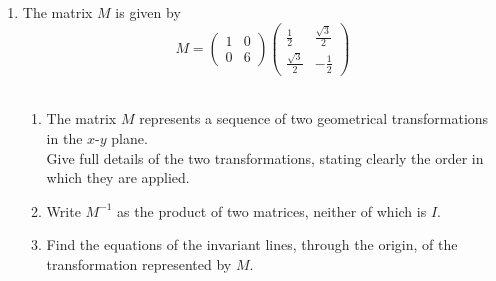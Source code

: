 \documentclass[leqno]{article}
\newcommand{\questionitem}{%
  \item\phantomsection
  \addcontentsline{toc}{section}{Question \number\value{enumi}}%
}
\begin{document}
\begin{enumerate}[
  label=\textbf{\arabic*.},
  leftmargin=*,
  topsep=0pt,
  partopsep=0pt,
  parsep=0pt
]
\begin{tcolorbox}[colback=white, colframe=scarlet, title={\textbf{Solution}}, breakable, grow to left by=6mm, grow to right by=10mm]
\begin{enumerate}[label=\textbf{(\alph*)}]
  So the image is $P'=(-8,1)$.

  For a reflection, the mirror line is the perpendicular bisector of $PP'$. So the closest point on the mirror line to $P$ is the midpoint of $PP'$:
  \[
  \left(\frac{4+(-8)}{2},\frac{7+1}{2}\right)
  =
  \left(\frac{-4}{2},\frac{8}{2}\right)
  =
  (-2,4)
  \]

  Therefore the point on the mirror line closest to $P$ is $(-2,4)$.

  \item The mirror line is $y=-2x$, which passes through the origin.

  The line $2x+by=6$ does not pass through the origin, so it cannot be the mirror line. For it to be invariant under the reflection, it must be perpendicular to the mirror line.

  The slope of $y=-2x$ is $-2$.

  Rewrite $2x+by=6$ as
  \[
  y=-\frac{2}{b}x+\frac{6}{b}
  \]
  so its slope is $-\dfrac{2}{b}$.

  Since perpendicular lines have slopes whose product is $-1$,
  \[
  (-2)\left(-\frac{2}{b}\right)=-1
  \]

  So
  \[
  \frac{4}{b}=-1
  \]
  giving
  \[
  b=-4
  \]

  Therefore $b=-4$.
\end{enumerate}
\end{tcolorbox}


\newpage

\questionitem

The matrix $M$ is given by
\[
M = \begin{pmatrix} 1 & 0 \\[6pt] 0 & 6 \end{pmatrix}\begin{pmatrix} \frac{1}{2} & \frac{\sqrt{3}}{2} \\[6pt] \frac{\sqrt{3}}{2} & -\frac{1}{2} \end{pmatrix}
\] \\
\begin{enumerate}[label=\textbf{(\alph*)}]
  \item The matrix $M$ represents a sequence of two geometrical transformations in the $x$-$y$ plane. \\
  Give full details of the two transformations, stating clearly the order in which they are applied.  \\
  \item Write $M^{-1}$ as the product of two matrices, neither of which is $I$.  \\
  \item Find the equations of the invariant lines, through the origin, of the transformation represented by $M$.  \\
\end{enumerate}


\end{enumerate}
\end{document}
